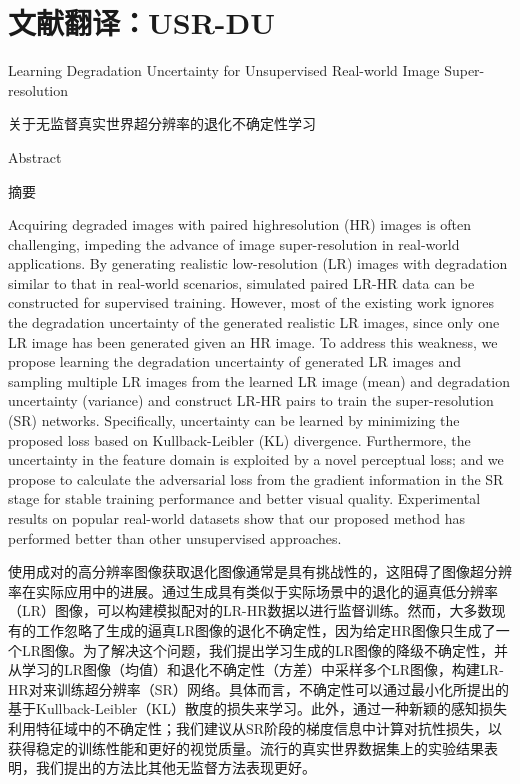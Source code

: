 \chapter{文献翻译：USR-DU}

Learning Degradation Uncertainty for Unsupervised Real-world Image Super-resolution

关于无监督真实世界超分辨率的退化不确定性学习

Abstract

摘要

Acquiring degraded images with paired highresolution (HR) images is often challenging, impeding the advance of image super-resolution in real-world applications. By generating realistic low-resolution (LR) images with degradation similar to that in real-world scenarios, simulated paired LR-HR data can be constructed for supervised training. However, most of the existing work ignores the degradation uncertainty of the generated realistic LR images, since only one LR image has been generated given an HR image. To address this weakness, we propose learning the degradation uncertainty of generated LR images and sampling multiple LR images from the learned LR image (mean) and degradation uncertainty (variance) and construct LR-HR pairs to train the super-resolution (SR) networks. Specifically, uncertainty can be learned by minimizing the proposed loss based on Kullback-Leibler (KL) divergence. Furthermore, the uncertainty in the feature domain is exploited by a novel perceptual loss; and we propose to calculate the adversarial loss from the gradient information in the SR stage for stable training performance and better visual quality. Experimental results on popular real-world datasets show that our proposed method has performed better than other unsupervised approaches.

使用成对的高分辨率图像获取退化图像通常是具有挑战性的，这阻碍了图像超分辨率在实际应用中的进展。通过生成具有类似于实际场景中的退化的逼真低分辨率（LR）图像，可以构建模拟配对的LR-HR数据以进行监督训练。然而，大多数现有的工作忽略了生成的逼真LR图像的退化不确定性，因为给定HR图像只生成了一个LR图像。为了解决这个问题，我们提出学习生成的LR图像的降级不确定性，并从学习的LR图像（均值）和退化不确定性（方差）中采样多个LR图像，构建LR-HR对来训练超分辨率（SR）网络。具体而言，不确定性可以通过最小化所提出的基于Kullback-Leibler（KL）散度的损失来学习。此外，通过一种新颖的感知损失利用特征域中的不确定性；我们建议从SR阶段的梯度信息中计算对抗性损失，以获得稳定的训练性能和更好的视觉质量。流行的真实世界数据集上的实验结果表明，我们提出的方法比其他无监督方法表现更好。

